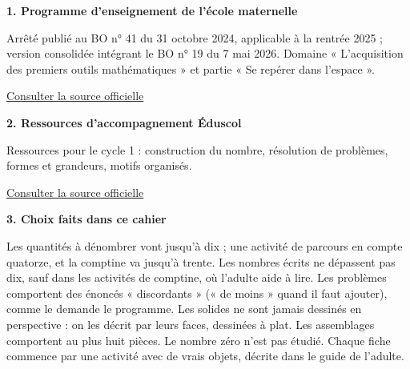 \clearpage\pagestyle{matSimple}\label{sources}
{\fontsize{9.5}{13.5}\selectfont \textbf{1. Programme d’enseignement de l’école maternelle}\par Arrêté publié au BO n° 41 du 31 octobre 2024, applicable à la rentrée 2025 ; version consolidée intégrant le BO n° 19 du 7 mai 2026. Domaine « L’acquisition des premiers outils mathématiques » et partie « Se repérer dans l’espace ».\par\href{https://eduscol.education.gouv.fr/sites/default/files/document/programme-cycle-1-consolide-127565.pdf}{\textcolor{otGreenDark}{Consulter la source officielle}}\par\medskip
\textbf{2. Ressources d’accompagnement Éduscol}\par Ressources pour le cycle 1 : construction du nombre, résolution de problèmes, formes et grandeurs, motifs organisés.\par\href{https://eduscol.education.gouv.fr/}{\textcolor{otGreenDark}{Consulter la source officielle}}\par\medskip
\textbf{3. Choix faits dans ce cahier}\par Les quantités à dénombrer vont jusqu’à dix ; une activité de parcours en compte quatorze, et la comptine va jusqu’à trente. Les nombres écrits ne dépassent pas dix, sauf dans les activités de comptine, où l’adulte aide à lire. Les problèmes comportent des énoncés « discordants » (« de moins » quand il faut ajouter), comme le demande le programme. Les solides ne sont jamais dessinés en perspective : on les décrit par leurs faces, dessinées à plat. Les assemblages comportent au plus huit pièces. Le nombre zéro n’est pas étudié. Chaque fiche commence par une activité avec de vrais objets, décrite dans le guide de l’adulte.\par}
